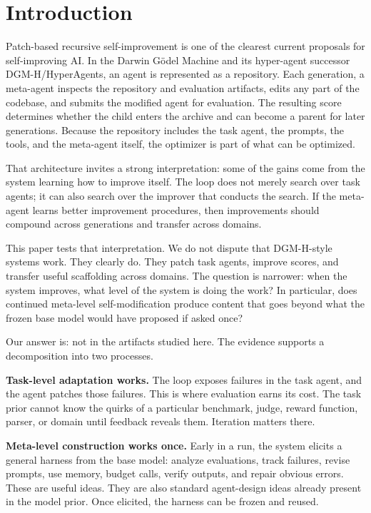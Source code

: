 \documentclass[11pt]{article}
\begin{document}
\section{Introduction}\label{introduction}

Patch-based recursive self-improvement is one of the clearest current proposals for self-improving AI. In the Darwin Gödel Machine and its hyper-agent successor DGM-H/\allowbreak HyperAgents, an agent is represented as a repository. Each generation, a meta-agent inspects the repository and evaluation artifacts, edits any part of the codebase, and submits the modified agent for evaluation. The resulting score determines whether the child enters the archive and can become a parent for later generations. Because the repository includes the task agent, the prompts, the tools, and the meta-agent itself, the optimizer is part of what can be optimized.

That architecture invites a strong interpretation: some of the gains come from the system learning how to improve itself. The loop does not merely search over task agents; it can also search over the improver that conducts the search. If the meta-agent learns better improvement procedures, then improvements should compound across generations and transfer across domains.

This paper tests that interpretation. We do not dispute that DGM-H-style systems work. They clearly do. They patch task agents, improve scores, and transfer useful scaffolding across domains. The question is narrower: when the system improves, what level of the system is doing the work? In particular, does continued meta-level self-modification produce content that goes beyond what the frozen base model would have proposed if asked once?

Our answer is: not in the artifacts studied here. The evidence supports a decomposition into two processes.

\textbf{Task-level adaptation works.} The loop exposes failures in the task agent, and the agent patches those failures. This is where evaluation earns its cost. The task prior cannot know the quirks of a particular benchmark, judge, reward function, parser, or domain until feedback reveals them. Iteration matters there.

\textbf{Meta-level construction works once.} Early in a run, the system elicits a general harness from the base model: analyze evaluations, track failures, revise prompts, use memory, budget calls, verify outputs, and repair obvious errors. These are useful ideas. They are also standard agent-design ideas already present in the model prior. Once elicited, the harness can be frozen and reused.
\end{document}
